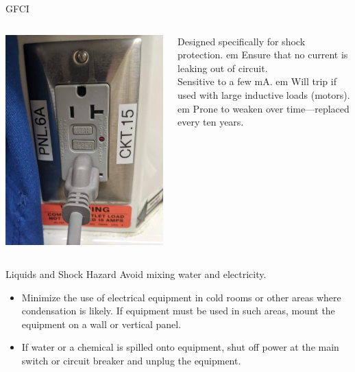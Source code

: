 \documentclass{presentation}
\begin{document}
\begin{frame}{GFCI}
  \begin{columns}
    \begin{column}{0.33\textwidth}
      \includegraphics[width=\textwidth]{"./PXL_20230117_221804507.jpg"}
    \end{column}
    \begin{column}{0.67\textwidth}
      Designed specifically for shock protection.
       em
      Ensure that no current is leaking out of circuit. \\
      Sensitive to a few mA.
       em
      Will trip if used with large inductive loads (motors).
       em
      Prone to weaken over time---replaced every ten years.
    \end{column}
  \end{columns}
\end{frame}

\begin{frame}{Liquids and Shock Hazard}
  Avoid mixing water and electricity.
  \begin{itemize}
    \item Minimize the use of electrical equipment in cold rooms or other areas where condensation is likely. If equipment must be used in such areas, mount the equipment on a wall or vertical panel.
    \item If water or a chemical is spilled onto equipment, shut off power at the main switch or circuit breaker and unplug the equipment.
  \end{itemize}
\end{frame}
\end{document}
